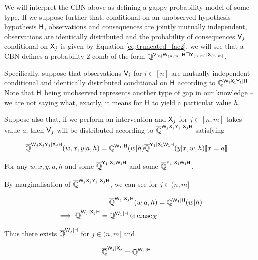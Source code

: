 We will interpret the CBN above as defining a gappy probability model of some type. If we suppose further that, conditional on an unobserved hypothesis hypothesis $\mathsf{H}$, observations and consequences are jointly mutually independent, observations are identically distributed and the probability of consequences $\mathsf{V}_j$ conditional on $\mathsf{X}_j$ is given by Equation \ref{eq:truncated_fac2}, we will see that a CBN defines a probability 2-comb of the form $\mathbb{Q}^{\mathsf{V}_{[n]}\mathsf{W}_{(n,m]}|\mathsf{H}\square \mathsf{Y}_{(n,m]}|\mathsf{X}_{(n,m]}}$.

Specifically, suppose that observations $\mathsf{V}_i$ for $i\in [n]$ are mutually independent conditional and identically distributed conditional on $\mathsf{H}$ according to $\mathbb{Q}^{\mathsf{W_1X_1Y_1}|\mathsf{H}}$. Note that $\mathsf{H}$ being unobserved represents another type of gap in our knowledge -- we are not saying what, exactly, it means for $\mathsf{H}$ to yield a particular value $h$.

Suppose also that, if we perform an intervention and $\mathsf{X}_{j}$ for $j\in [n,m]$ takes value $a$, then $\mathsf{V}_j$ will be distributed according to $\overline{\mathbb{Q}}^{\mathsf{W}_j\mathsf{X}_j\mathsf{Y}_j|\mathsf{X}_j\mathsf{H}}$ satisfying

\begin{align}
    \overline{\mathbb{Q}}^{\mathsf{W}_j\mathsf{X}_j\mathsf{Y}_j|\mathsf{X}_j\mathsf{H}}(w,x,y|a,h) &= \mathbb{Q}^{\mathsf{W}_1|\mathsf{H}}(w|h)\overline{\mathbb{Q}}^{\mathsf{Y}_1|\mathsf{X_1W_1H}}(y|x,w,h)\llbracket x=a \rrbracket\label{eq:truncated_to_seedo}
\end{align}

For any $w,x,y,a,h$ and some $\overline{\mathbb{Q}}^{\mathsf{Y}_1|\mathsf{X_1W_1H}}$ and some $\overline{\mathbb{Q}}^{\mathsf{Y}_1|\mathsf{X_1W_1H}}$.

By marginalisation of $\overline{\mathbb{Q}}^{\mathsf{W}_j\mathsf{X}_j\mathsf{Y}_j|\mathsf{X}_j\mathsf{H}}$, we can see for $j\in (n,m]$

\begin{align}
    \overline{\mathbb{Q}}^{\mathsf{W}_j|\mathsf{X}_j\mathsf{H}}(w|a,h) &= \mathbb{Q}^{\mathsf{W}_1|\mathsf{H}}(w|h)\\
    \implies \overline{\mathbb{Q}}^{\mathsf{W}_j|\mathsf{X}_j\mathsf{H}} = \mathbb{Q}^{\mathsf{W}_1|\mathsf{H}}\otimes \text{erase}_{X}
\end{align}

Thus there exists $\overline{\mathbb{Q}}^{\mathsf{W}_j|\mathsf{H}}$ for $j\in (n,m]$ and

\begin{align}
    \overline{\mathbb{Q}}^{\mathsf{W}_j|\mathsf{X}_j} &= \mathbb{Q}^{\mathsf{W}_1|\mathsf{H}}
\end{align}

